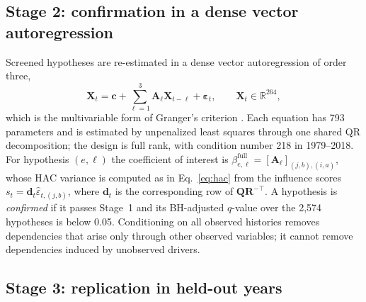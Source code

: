 \documentclass[preprint,12pt]{elsarticle}
\begin{document}
\subsection{Stage 2: confirmation in a dense vector autoregression}

Screened hypotheses are re-estimated in a dense vector autoregression of order three,
\begin{equation}
\mathbf{X}_t=\mathbf{c}+\sum_{\ell=1}^{3}\mathbf{A}_{\ell}\mathbf{X}_{t-\ell}+\boldsymbol{\varepsilon}_t,\qquad\mathbf{X}_t\in\mathbb{R}^{264},
\label{eq:var}
\end{equation}
which is the multivariable form of Granger's criterion \citep{Shojaie2022Granger}. Each equation has 793 parameters and is estimated by unpenalized least squares through one shared QR decomposition; the design is full rank, with condition number 218 in 1979--2018. For hypothesis $(e,\ell)$ the coefficient of interest is $\beta^{\mathrm{full}}_{e,\ell}=[\mathbf{A}_{\ell}]_{(j,b),(i,a)}$, whose HAC variance is computed as in Eq.~\eqref{eq:hac} from the influence scores $s_t=\mathbf{d}_t\widehat{\varepsilon}_{t,(j,b)}$, where $\mathbf{d}_t$ is the corresponding row of $\mathbf{Q}\mathbf{R}^{-\top}$. A hypothesis is \emph{confirmed} if it passes Stage~1 and its BH-adjusted $q$-value over the 2,574 hypotheses is below 0.05. Conditioning on all observed histories removes dependencies that arise only through other observed variables; it cannot remove dependencies induced by unobserved drivers.

\subsection{Stage 3: replication in held-out years}
\end{document}
